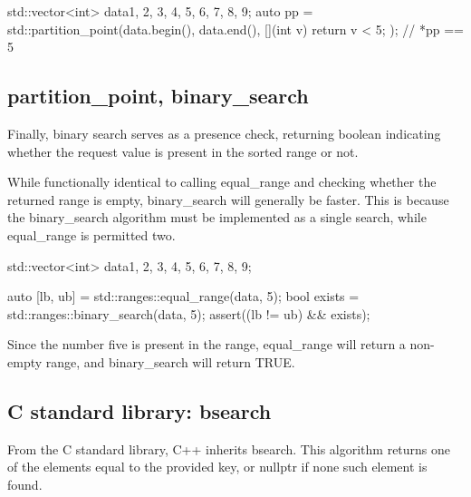 \begin{box-note}
\begin{cppcode}
std::vector<int> data{1, 2, 3, 4, 5, 6, 7, 8, 9};
auto pp = std::partition_point(data.begin(), data.end(), 
                                [](int v) { return v < 5; });
// *pp == 5
\end{cppcode}
\end{box-note}

\subsection{partition\_point, binary\_search}

Finally, binary search serves as a presence check, returning boolean indicating whether the request value is present in the sorted range or not.



While functionally identical to calling equal\_range and checking whether the returned range is empty, binary\_search will generally be faster. This is because the binary\_search algorithm must be implemented as a single search, while equal\_range is permitted two.

\begin{box-note}
\begin{cppcode}
std::vector<int> data{1, 2, 3, 4, 5, 6, 7, 8, 9};

auto [lb, ub] = std::ranges::equal_range(data, 5);
bool exists = std::ranges::binary_search(data, 5);
assert((lb != ub) && exists);
\end{cppcode}
\end{box-note}

Since the number five is present in the range, equal\_range will return a non-empty range, and binary\_search will return TRUE.

\subsection{C standard library: bsearch}

From the C standard library, C++ inherits bsearch. This algorithm returns one of the elements equal to the provided key, or nullptr if none such element is found.

